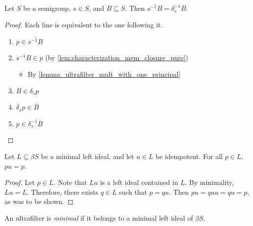 \begin{lemma}
\label{lemma_pull_out_inverse_mult_in_basis_set}
\leanok{}
    Let $S$ be a semigroup, $s \in S$, and $B \subseteq S$. Then $\overline{s^{-1} B} = \delta_s^{-1} \overline{B}$.
\end{lemma}

\begin{proof}
\leanok{}
    Each line is equivalent to the one following it.
    \begin{enumerate}
        \item $p \in \overline{s^{-1} B}$
        \item $s^{-1} B \in p$ (by \cref{lem:characterization_mem_closure_pure})
        \begin{itemize}
            \item By \cref{lemma_ultrafilter_mult_with_one_principal}
        \end{itemize}
        \item $B \in \delta_s p$
        \item $\delta_s p \in \overline{B}$
        \item $p \in \delta_s^{-1} \overline{B}$
    \end{enumerate}
\end{proof}

\begin{lemma}
    \label{lemma_ru_is_r_for_idempotent}
    \leanok{}
    Let $L \subseteq \beta S$ be a minimal left ideal, and let $u \in L$  be idempotent.  For all $p \in L$, $pu = p$.
\end{lemma}

\begin{proof}
\leanok{}
    Let $p \in L$.  Note that $Lu$ is a left ideal contained in $L$.  By minimality, $Lu = L$.  Therefore, there exists $q \in L$ such that $p = qu$.  Then $pu = quu = qu = p$, as was to be shown.
\end{proof}

\begin{definition}
\label{def_minimal_ultrafilter}
\leanok{}
An ultrafilter is \emph{minimal} if it belongs to a minimal left ideal of $\beta S$.
\end{definition}


